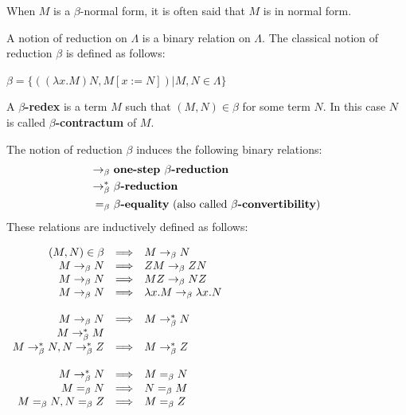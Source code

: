 When $M$ is a $\beta$-normal form, it is often said that $M$ is in normal form.


A notion of reduction on $\Lambda$ is a binary relation on $\Lambda$. The classical notion of reduction $\beta$ is defined as follows:
\begin{definition} $\beta = \{ ( (\lambda x. M)N , M[x:=N] ) | M, N \in \Lambda  \} $
\end{definition}

\begin{definition} 
A \textbf{$\beta$-redex} is a term $M$ such that $(M,N) \in \beta$ for some term $N$. In this case $N$ is called \textbf{$\beta$-contractum} of $M$.
\end{definition}

\begin{definition} The notion of reduction $\beta$ induces the following binary relations:
\begin{align*}
\rightarrow_\beta \  & \textbf{one-step } \beta \textbf{-reduction} \\
\rightarrow^{*}_\beta \  &  \beta \textbf{-reduction} \\
=_{\beta} \  & \beta \textbf{-equality} \text{ (also called } \beta \textbf{-convertibility}\text{)} 
\end{align*}
These relations are inductively defined as follows:
\begin{center}
$
\begin{array}{rcl}
(M,N) \in \beta & \Longrightarrow & M \rightarrow_\beta N \\
M \rightarrow_\beta N &  \Longrightarrow & ZM \rightarrow_\beta ZN \\ 
M \rightarrow_\beta N &  \Longrightarrow & MZ \rightarrow_\beta NZ \\ 
M \rightarrow_\beta N & \Longrightarrow & \lambda x.M \rightarrow_\beta \lambda x.N \\
& & \\
M \rightarrow_\beta N &  \Longrightarrow & M \rightarrow^{*}_\beta N \\ 
M \rightarrow^{*}_\beta M & \\ 
M \rightarrow^{*}_\beta N, N \rightarrow^{*}_\beta Z & \Longrightarrow & M \rightarrow^{*}_\beta Z \\
&& \\
M \rightarrow^{*}_\beta N &  \Longrightarrow & M =_{\beta} N \\ 
M =_{\beta} N & \Longrightarrow & N =_{\beta} M\\ 
M =_{\beta} N, N =_{\beta} Z & \Longrightarrow & M =_{\beta} Z 
\end{array} 
$
\end{center}


\end{definition}

